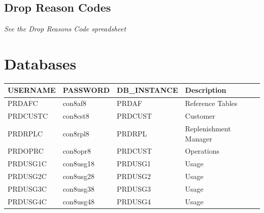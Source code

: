 \documentclass[12pt,twoside]{article}
\begin{document}
\normalsize
\subsection{Drop Reason Codes}
\label{sec-7-5}

   \emph{See the Drop Reasons Code spreadsheet}

\vspace*{2.5cm} 
\noindent{}

\newpage
\section{Databases}
\label{sec-8}


\footnotesize


\begin{center}
\begin{tabular}{llll}
\hline
 \textbf{USERNAME}  &  \textbf{PASSWORD}  &  \textbf{DB\_INSTANCE}  &  \textbf{Description}   \\
\hline
 PRDAFC             &  con8af8            &  PRDAF                  &  Reference Tables       \\
 PRDCUSTC           &  con8cst8           &  PRDCUST                &  Customer               \\
 PRDRPLC            &  con8rpl8           &  PRDRPL                 &  Replenishment Manager  \\
 PRDOPRC            &  con8opr8           &  PRDCUST                &  Operations             \\
 PRDUSG1C           &  con8usg18          &  PRDUSG1                &  Usage                  \\
 PRDUSG2C           &  con8usg28          &  PRDUSG2                &  Usage                  \\
 PRDUSG3C           &  con8usg38          &  PRDUSG3                &  Usage                  \\
 PRDUSG4C           &  con8usg48          &  PRDUSG4                &  Usage                  \\
\hline
\end{tabular}
\end{center}
\end{document}
